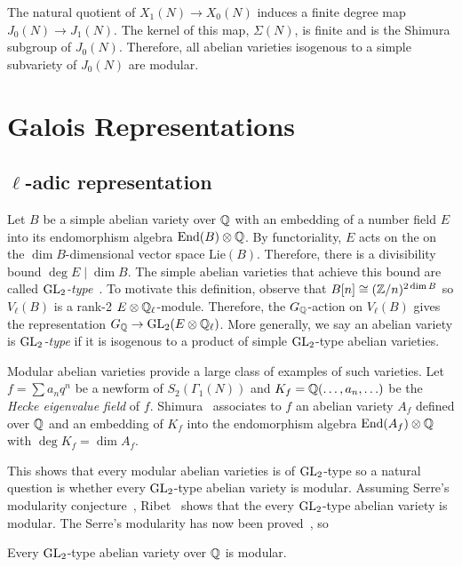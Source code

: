 \documentclass[11pt, proquest]{uwthesis}
\begin{document}
The natural quotient of $X_1(N)\to X_0(N)$ induces a finite degree map
$J_0(N)\to J_1(N)$. The kernel of this map, $\Sigma(N)$, is finite and is the
Shimura subgroup of $J_0(N)$. Therefore, all abelian varieties isogenous to a
simple subvariety of $J_0(N)$ are modular.


\section{Galois Representations}

\subsection{$\ell$-adic representation}%
\label{sub:_ell_adic_representation}

Let $B$ be a simple abelian variety over $\mathbb{Q}$ with an embedding of a number
field $E$ into its endomorphism algebra $\operatorname{End}(B)\otimes \mathbb{Q}$. By functoriality,
$E$ acts on the on the $\dim B$-dimensional vector space $\mathrm{Lie}(B)$.
Therefore, there is a divisibility bound $\deg E\mid \dim B$. The simple
abelian varieties that achieve this bound are called
\emph{$\operatorname{GL}_2$-type}~\cite[\S 2]{ribet:abvars}. To motivate this definition,
observe that $B[n]\cong (\mathbb{Z}/n)^{2\dim B}$ so $V_\ell(B)$ is a rank-2 $E\otimes
\mathbb{Q}_\ell$-module. Therefore, the $G_{\mathbb{Q}}$-action on $V_\ell(B)$ gives the
representation $G_{\mathbb{Q}}\to \operatorname{GL}_2(E\otimes \mathbb{Q}_\ell)$. More generally, we say an
abelian variety is \emph{$\operatorname{GL}_2$-type} if it is isogenous to a product of
simple $\operatorname{GL}_2$-type abelian varieties.

Modular abelian varieties provide a large class of examples of such varieties.
Let $f=\sum a_n q^n$ be a newform of $S_2(\Gamma_1(N))$ and
$K_f=\mathbb{Q}(\ldots,a_n,\ldots)$ be the \emph{Hecke eigenvalue field} of $f$.
Shimura~\cite[Theorem 7.14]{shimura:intro} associates to $f$ an abelian variety
$A_f$ defined over $\mathbb{Q}$ and an embedding of $K_f$ into the endomorphism
algebra $\operatorname{End}(A_f)\otimes \mathbb{Q}$ with $\deg K_f = \dim A_f$.

This shows that every modular abelian varieties is of $\operatorname{GL}_2$-type so a natural
question is whether every $\operatorname{GL}_2$-type abelian variety is modular. Assuming Serre's
modularity conjecture~\cite[3.2.4]{serre:conjectures}, Ribet~\cite[Thm.
4.4]{ribet:abvars} shows that the every $\operatorname{GL}_2$-type abelian variety is
modular. The Serre's modularity has now been proved~\cite{}, so
\begin{theorem}
    Every $\operatorname{GL}_2$-type abelian variety over $\mathbb{Q}$ is modular.
\end{theorem}
\end{document}
